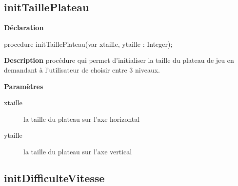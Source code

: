 \documentclass{report}
\newif\ifpdf
\begin{document}
\subsection*{initTaillePlateau}
\fi
\label{Initialisation-initTaillePlateau}
\begin{list}{}{
\setlength{\itemindent}{0cm}
\setlength{\listparindent}{0cm}
\setlength{\leftmargin}{\evensidemargin}
\addtolength{\leftmargin}{\tmplength}
\settowidth{\labelsep}{X}
\addtolength{\leftmargin}{\labelsep}
\setlength{\labelwidth}{\tmplength}
}
\item[\textbf{Déclaration}\hfill]
\ifpdf
\begin{flushleft}
\fi
\begin{ttfamily}
procedure initTaillePlateau(var xtaille, ytaille : Integer);\end{ttfamily}

\ifpdf
\end{flushleft}
\fi

\par
\item[\textbf{Description}]
procédure qui permet d'initialiser la taille du plateau de jeu en demandant à l'utilisateur de choisir entre 3 niveaux.  \par
\item[\textbf{Paramètres}]
\begin{description}
\item[xtaille] la taille du plateau sur l'axe horizontal
\item[ytaille] la taille du plateau sur l'axe vertical
\end{description}


\end{list}
\ifpdf
\subsection*{\large{\textbf{initDifficulteVitesse}}\normalsize\hspace{1ex}\hrulefill}
\else
\end{document}
